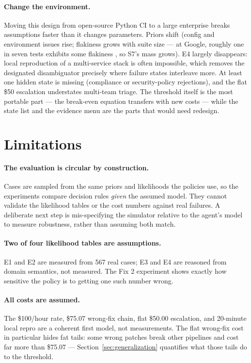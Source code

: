 \documentclass{article}
\begin{document}
\paragraph{Change the environment.} Moving this design from open-source Python CI to a large enterprise breaks assumptions faster than it changes parameters. Priors shift (config and environment issues rise; flakiness grows with suite size --- at Google, roughly one in seven tests exhibits some flakiness \cite{micco2016flaky}, so S7's mass grows). E4 largely disappears: local reproduction of a multi-service stack is often impossible, which removes the designated disambiguator precisely where failure states interleave more. At least one hidden state is missing (compliance or security-policy rejections), and the flat \$50 escalation understates multi-team triage. The threshold itself is the most portable part --- the break-even equation transfers with new costs --- while the state list and the evidence menu are the parts that would need redesign.

\section{Limitations}
\label{sec:limitations}

\paragraph{The evaluation is circular by construction.} Cases are sampled from the same priors and likelihoods the policies use, so the experiments compare decision rules \emph{given} the assumed model. They cannot validate the likelihood tables or the cost numbers against real failures. A deliberate next step is mis-specifying the simulator relative to the agent's model to measure robustness, rather than assuming both match.

\paragraph{Two of four likelihood tables are assumptions.} E1 and E2 are measured from 567 real cases; E3 and E4 are reasoned from domain semantics, not measured. The Fix 2 experiment shows exactly how sensitive the policy is to getting one such number wrong.

\paragraph{All costs are assumed.} The \$100/hour rate, \$75.07 wrong-fix chain, flat \$50.00 escalation, and 20-minute local repro are a coherent first model, not measurements. The flat wrong-fix cost in particular hides fat tails: some wrong patches break other pipelines and cost far more than \$75.07 --- Section~\ref{sec:generalization} quantifies what those tails do to the threshold.
\end{document}
